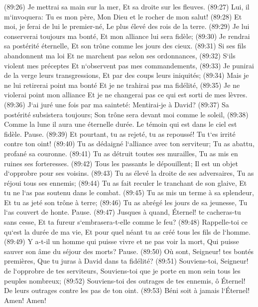 \verse (89:26) Je mettrai sa main sur la mer, Et sa droite sur les fleuves. 
\verse (89:27) Lui, il m`invoquera: Tu es mon père, Mon Dieu et le rocher de mon salut! 
\verse (89:28) Et moi, je ferai de lui le premier-né, Le plus élevé des rois de la terre. 
\verse (89:29) Je lui conserverai toujours ma bonté, Et mon alliance lui sera fidèle; 
\verse (89:30) Je rendrai sa postérité éternelle, Et son trône comme les jours des cieux. 
\verse (89:31) Si ses fils abandonnent ma loi Et ne marchent pas selon ses ordonnances, 
\verse (89:32) S`ils violent mes préceptes Et n`observent pas mes commandements, 
\verse (89:33) Je punirai de la verge leurs transgressions, Et par des coups leurs iniquités; 
\verse (89:34) Mais je ne lui retirerai point ma bonté Et je ne trahirai pas ma fidélité, 
\verse (89:35) Je ne violerai point mon alliance Et je ne changerai pas ce qui est sorti de mes lèvres. 
\verse (89:36) J`ai juré une fois par ma sainteté: Mentirai-je à David? 
\verse (89:37) Sa postérité subsistera toujours; Son trône sera devant moi comme le soleil, 
\verse (89:38) Comme la lune il aura une éternelle durée. Le témoin qui est dans le ciel est fidèle. Pause. 
\verse (89:39) Et pourtant, tu as rejeté, tu as repoussé! Tu t`es irrité contre ton oint! 
\verse (89:40) Tu as dédaigné l`alliance avec ton serviteur; Tu as abattu, profané sa couronne. 
\verse (89:41) Tu as détruit toutes ses murailles, Tu as mis en ruines ses forteresses. 
\verse (89:42) Tous les passants le dépouillent; Il est un objet d`opprobre pour ses voisins. 
\verse (89:43) Tu as élevé la droite de ses adversaires, Tu as réjoui tous ses ennemis; 
\verse (89:44) Tu as fait reculer le tranchant de son glaive, Et tu ne l`as pas soutenu dans le combat. 
\verse (89:45) Tu as mis un terme à sa splendeur, Et tu as jeté son trône à terre; 
\verse (89:46) Tu as abrégé les jours de sa jeunesse, Tu l`as couvert de honte. Pause. 
\verse (89:47) Jusques à quand, Éternel! te cacheras-tu sans cesse, Et ta fureur s`embrasera-t-elle comme le feu? 
\verse (89:48) Rappelle-toi ce qu`est la durée de ma vie, Et pour quel néant tu as créé tous les fils de l`homme. 
\verse (89:49) Y a-t-il un homme qui puisse vivre et ne pas voir la mort, Qui puisse sauver son âme du séjour des morts? Pause. 
\verse (89:50) Où sont, Seigneur! tes bontés premières, Que tu juras à David dans ta fidélité? 
\verse (89:51) Souviens-toi, Seigneur! de l`opprobre de tes serviteurs, Souviens-toi que je porte en mon sein tous les peuples nombreux; 
\verse (89:52) Souviens-toi des outrages de tes ennemis, ô Éternel! De leurs outrages contre les pas de ton oint. 
\verse (89:53) Béni soit à jamais l`Éternel! Amen! Amen! 

